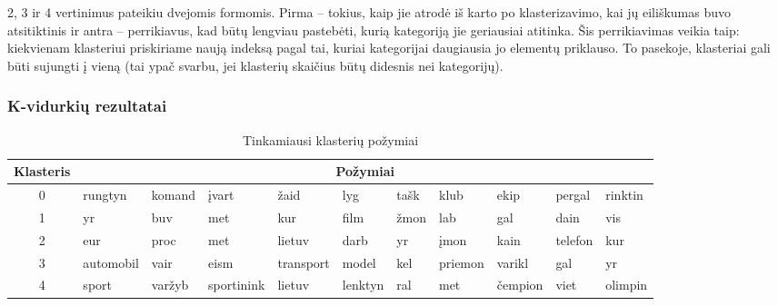 \documentclass{VUMIFInfKursinis}
\begin{document}
2, 3 ir 4 vertinimus pateikiu dvejomis formomis. Pirma – tokius, kaip
jie atrodė iš karto po klasterizavimo, kai jų eiliškumas buvo
atsitiktinis ir antra – perrikiavus, kad būtų lengviau pastebėti, kurią
kategoriją jie geriausiai atitinka. Šis perrikiavimas veikia taip:
kiekvienam klasteriui priskiriame naują indeksą pagal tai, kuriai
kategorijai daugiausia jo elementų priklauso. To pasekoje, klasteriai
gali būti sujungti į vieną (tai ypač svarbu, jei klasterių skaičius būtų
didesnis nei kategorijų).





\subsubsection{K-vidurkių rezultatai}

\begin{table}[!h]
	\footnotesize
	\caption{Tinkamiausi klasterių požymiai}

	\begin{tabular}{|c|l|l|l|l|l|l|l|l|l|l|}
	\hline
	Klasteris & \multicolumn{10}{c|}{Požymiai} \\ \hline
	0 & rungtyn & komand & įvart & žaid & lyg & tašk & klub & ekip & pergal
	& rinktin\\ \hline
	1 & yr & buv & met & kur & film & žmon & lab & gal & dain &
	vis\\ \hline
	2 & eur & proc & met & lietuv & darb & yr & įmon & kain & telefon &
	kur\\ \hline
	3 & automobil & vair & eism & transport & model & kel & priemon & varikl
	& gal & yr\\ \hline
	4 & sport & varžyb & sportinink & lietuv & lenktyn & ral & met & čempion
	& viet & olimpin\\ \hline
	\end{tabular}
\end{table}
\end{document}
